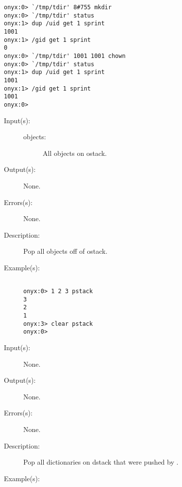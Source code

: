 \begin{description}
\begin{description}
\begin{verbatim}
onyx:0> `/tmp/tdir' 8#755 mkdir
onyx:0> `/tmp/tdir' status 
onyx:1> dup /uid get 1 sprint
1001
onyx:1> /gid get 1 sprint
0
onyx:0> `/tmp/tdir' 1001 1001 chown
onyx:0> `/tmp/tdir' status
onyx:1> dup /uid get 1 sprint
1001
onyx:1> /gid get 1 sprint
1001
onyx:0>
		\end{verbatim}
	\end{description}
\label{systemdict:clear}
\item[{\onyxop{objects}{clear}{--}}: ]
	\begin{description}\item[]
	\item[Input(s): ]
		\begin{description}\item[]
		\item[objects: ]
			All objects on ostack.
		\end{description}
	\item[Output(s): ] None.
	\item[Errors(s): ] None.
	\item[Description: ]
		Pop all objects off of ostack.
	\item[Example(s): ]\begin{verbatim}

onyx:0> 1 2 3 pstack
3
2
1
onyx:3> clear pstack
onyx:0>
		\end{verbatim}
	\end{description}
\label{systemdict:cleardstack}
\item[{\onyxop{--}{cleardstack}{--}}: ]
	\begin{description}\item[]
	\item[Input(s): ] None.
	\item[Output(s): ] None.
	\item[Errors(s): ] None.
	\item[Description: ]
		Pop all dictionaries on dstack that were pushed by
		.
	\item[Example(s): ]\begin{verbatim}


\end{verbatim}
\end{description}
\end{description}
